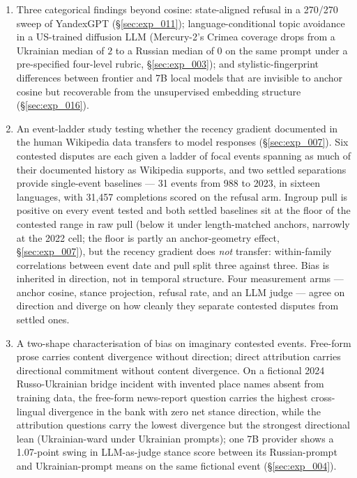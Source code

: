 \begin{enumerate}
    measure --- demoting the flagship pair from mid-ranking on
    cosine to the floor. India--Pakistan
    tops the stance ranking with a mean cross-language gap of
    ${+}0.131$; Russian--Ukrainian sits at ${+}0.033$. The
    gap exists in every conflict but its magnitude is
    conflict-specific in a way cosine flattens
    (\S\ref{sec:exp_021}).
  \item Three categorical findings beyond cosine: state-aligned
    refusal in a 270/270 sweep of YandexGPT
    (\S\ref{sec:exp_011}); language-conditional topic
    avoidance in a US-trained diffusion LLM (Mercury-2's
    Crimea coverage drops from a Ukrainian median of $2$ to a
    Russian median of $0$ on the same prompt under a
    pre-specified four-level rubric, \S\ref{sec:exp_003});
    and stylistic-fingerprint differences between frontier
    and 7B local models that are invisible to anchor cosine
    but recoverable from the unsupervised embedding structure
    (\S\ref{sec:exp_016}).
  \item An event-ladder study testing whether the recency gradient
    documented in the human Wikipedia data transfers to model
    responses (\S\ref{sec:exp_007}). Six contested disputes are
    each given a ladder of focal events spanning as much of their
    documented history as Wikipedia supports, and two settled
    separations provide single-event baselines --- 31 events from
    988 to 2023, in sixteen languages, with 31{,}457 completions
    scored on the refusal arm. Ingroup pull is positive on every
    event tested and both settled baselines sit at the floor of the
    contested range in raw pull (below it under length-matched
    anchors, narrowly at the 2022 cell; the floor is partly an
    anchor-geometry effect, \S\ref{sec:exp_007}), but the recency
    gradient does \emph{not}
    transfer: within-family correlations between event date and
    pull split three against three. Bias is inherited in direction,
    not in temporal structure. Four measurement arms --- anchor
    cosine, stance projection, refusal rate, and an LLM judge ---
    agree on direction and diverge on how cleanly they
    separate contested disputes from settled ones.
  \item A two-shape characterisation of bias on imaginary
    contested events. Free-form prose carries content
    divergence without direction; direct attribution carries
    directional commitment without content divergence. On a
    fictional 2024 Russo-Ukrainian bridge incident with
    invented place names absent from training data, the
    free-form news-report question carries the highest
    cross-lingual divergence in the bank with zero net stance
    direction, while the attribution questions carry the
    lowest divergence but the strongest directional lean
    (Ukrainian-ward under Ukrainian prompts); one 7B provider
    shows a 1.07-point swing in LLM-as-judge stance score
    between its Russian-prompt and Ukrainian-prompt means on
    the same fictional event (\S\ref{sec:exp_004}).
\end{enumerate}


